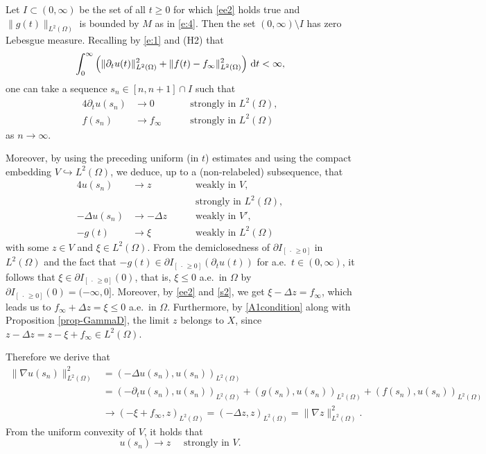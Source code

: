 \documentclass[reqno,10pt]{amsart}
\begin{document}
Let $I \subset (0,\infty)$ be the set of all $t \geq 0$ for which \eqref{ee2}
holds true and $\|g(t)\|_{L^2(\Omega)}$ is bounded by $M$ as in \eqref{e:4}.
Then the set $(0,\infty) \setminus I$ has zero Lebesgue measure. Recalling by
\eqref{e:1} and (H2) that
$$
\int^\infty_0 \left( \| \partial_t u(t) \|_{L^2(\Omega)}^2 + \|f(t) -
f_\infty\|_{L^2(\Omega)}^2 \right) \, {\text{\rm d}} t < \infty,
$$
one can take a sequence $s_n \in [n,n+1] \cap I$ such that
\begin{alignat}{4}
\partial_t u(s_n) &\to 0 \quad &&\mbox{ strongly in } L^2(\Omega),\label{s1}\\
 f(s_n) &\to f_\infty \quad &&\mbox{ strongly in } L^2(\Omega) \label{s2}
\end{alignat}
as $n \to \infty$.

Moreover, by using the preceding uniform (in $t$) estimates and using
 the compact embedding $V \hookrightarrow L^2(\Omega)$, we deduce,
 up to a (non-relabeled) subsequence, that
\begin{alignat}{4}
 u(s_n) &\to {z} \quad &&\mbox{ weakly in } V,\\
 & &&\mbox{ strongly in } L^2(\Omega),\label{c:u-2}\\
 - \Delta u(s_n) &\to - \Delta {z} \quad &&\mbox{ weakly in } V',\\
 - g(t) &\to \xi \quad &&\mbox{ weakly in }
 L^2(\Omega) 
\end{alignat}
with some ${z} \in V$ and $\xi \in L^2(\Omega)$.
From the demiclosedness of $\partial {I_{[~\cdot\, \geq 0]}}$ in $L^2(\Omega)$ and the fact
that $-g(t) \in \partial {I_{[~\cdot\, \geq 0]}}(\partial_t u(t))$ for a.e.~$t \in
(0,\infty)$, it follows that $\xi \in \partial {I_{[~\cdot\, \geq 0]}} (0)$, that is, $\xi
\leq 0$ a.e.~in $\Omega$ by $\partial {I_{[~\cdot\, \geq 0]}} (0) = (-\infty,0]$. 
Moreover, by \eqref{ee2} and \eqref{s2}, we
 get $\xi - \Delta {z} = f_\infty$, which leads us to $f_\infty +
 \Delta {z} = \xi \leq 0$ a.e.~in $\Omega$. 
Furthermore, by \eqref{A1condition} along with Proposition
\ref{prop-GammaD}, the limit ${z}$ belongs to $X$, since
${z} - \Delta {z} = {z} - \xi + f_\infty \in L^2(\Omega)$.

Therefore we derive that
\begin{align*}
 \|\nabla u(s_n)\|_{L^2(\Omega)}^2
 &= \left( - \Delta u(s_n), u(s_n) \right)_{L^2(\Omega)}\\
 &= \left( - \partial_t u(s_n), u(s_n) \right)_{L^2(\Omega)}
 + \left( g(s_n), u(s_n) \right)_{L^2(\Omega)}
 + \left( f(s_n), u(s_n) \right)_{L^2(\Omega)}\\
 &\to \left( - \xi + f_\infty, {z} \right)_{L^2(\Omega)}
 = \left(- \Delta {z} , {z} \right)_{L^2(\Omega)} = \|\nabla {z}\|_{L^2(\Omega)}^2.
\end{align*}
From the uniform convexity of $V$, it holds that
\begin{equation}\label{c:u-V}
u(s_n) \to {z} \quad \mbox{ strongly in } V.
\end{equation}
\end{document}
